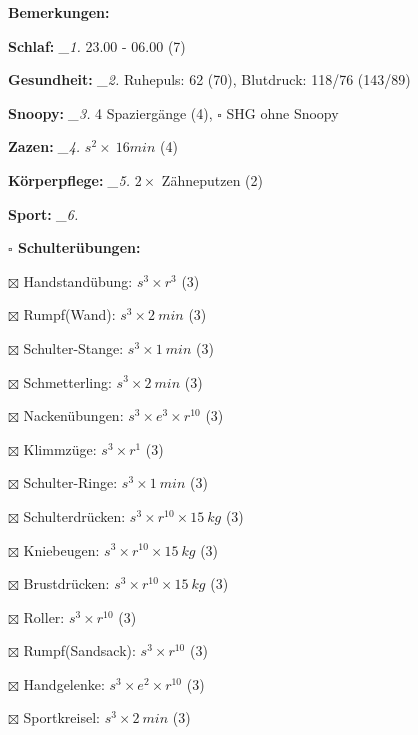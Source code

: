 \documentclass[10pt,a4paper]{article}
\newcommand\prop[1] {{\color {alizarin} {\bf #1}}}             %
\newcommand\mand[1] {{\color {burntorange} {\bf #1}}}          %
\newcommand\topspace{\vskip -15pt \hskip 20pt}
\newcommand\n[1] { {\sl #1.} \hskip 5pt }
\begin{document}
\begin{mdframed}[style=daystyle]
  \begin{labeling}{{\mand {Bemerkungen:}}}
    \setlength\itemsep{-3pt}
  \item[{\mand {Schlaf:}}]        \n{\_1} 23.00 - 06.00 (7)
  \item[{\mand {Gesundheit:}}]    \n{\_2} Ruhepuls: 62 (70), Blutdruck: 118/76 (143/89)
  \item[{\mand {Snoopy:}}]        \n{\_3} 4 Spaziergänge (4), $\square$ SHG ohne Snoopy
  \item[{\mand {Zazen:}}]         \n{\_4} $s^2 \times\ 16 min$ (4)
  \item[{\mand {Körperpflege:}}]  \n{\_5} $2 \times$ Zähneputzen (2)
  \item[{\mand {Sport:}}]         \n{\_6}
    \topspace
    \begin{minipage}{0.75\textwidth}  
      \begin{labeling}{\prop {$\square$ {Schulterübungen:}}} 
        \setlength\itemsep{-3pt}
      \item[$\boxtimes$ Handstandübung:]  $s^3 \times r^{3}$ (3)
      \item[$\boxtimes$ Rumpf(Wand):]     $s^3 \times 2\ min$ (3)
      \item[$\boxtimes$ Schulter-Stange:] $s^3 \times 1\ min$ (3)
      \item[$\boxtimes$ Schmetterling:]   $s^3 \times 2\ min$ (3)
      \item[$\boxtimes$ Nackenübungen:]   $s^3 \times e^3 \times r^{10}$ (3)
      \item[$\boxtimes$ Klimmzüge:]       $s^3 \times r^1$ (3)
      \item[$\boxtimes$ Schulter-Ringe:]  $s^3 \times 1\ min$ (3)
      \item[$\boxtimes$ Schulterdrücken:] $s^3 \times r^{10} \times 15\ kg$ (3)
      \item[$\boxtimes$ Kniebeugen:]      $s^3 \times r^{10} \times 15\ kg$ (3)
      \item[$\boxtimes$ Brustdrücken:]    $s^3 \times r^{10} \times 15\ kg$ (3)
      \item[$\boxtimes$ Roller:]          $s^3 \times r^{10}$ (3)
      \item[$\boxtimes$ Rumpf(Sandsack):] $s^3 \times r^{10}$ (3)
      \item[$\boxtimes$ Handgelenke:]     $s^3 \times e^2 \times r^{10}$ (3)
      \item[$\boxtimes$ Sportkreisel:]    $s^3 \times 2\ min$ (3)

\end{labeling}
\end{minipage}
\end{labeling}
\end{mdframed}
\end{document}
